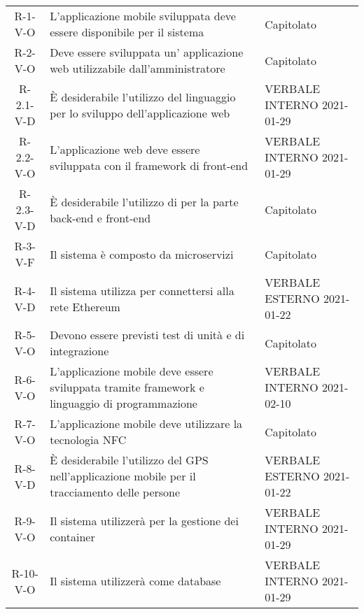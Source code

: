 \begin{longtable}{ c C{7.5cm} C{3cm} }
    R-1-V-O     & L'applicazione mobile sviluppata deve essere disponibile per il sistema  & Capitolato\\
    R-2-V-O     & Deve essere sviluppata un' applicazione web utilizzabile dall'amministratore & Capitolato\\
    R-2.1-V-D   & \`{E} desiderabile l'utilizzo del linguaggio  per lo sviluppo dell'applicazione web & VERBALE INTERNO 2021-01-29 \\
    R-2.2-V-O   & L'applicazione web deve essere sviluppata con il framework di front-end  & VERBALE INTERNO 2021-01-29 \\
    R-2.3-V-D   & \`{E} desiderabile l'utilizzo di  per la parte back-end e front-end &  Capitolato \\
    R-3-V-F     & Il sistema è composto da microservizi & Capitolato\\
    R-4-V-D     & Il sistema utilizza  per connettersi alla rete Ethereum & VERBALE ESTERNO 2021-01-22\\
    R-5-V-O     & Devono essere previsti test di unità e di integrazione & Capitolato\\
    R-6-V-O     & L'applicazione mobile deve essere sviluppata tramite framework  e linguaggio di programmazione  & VERBALE INTERNO 2021-02-10 \\
    R-7-V-O     & L'applicazione mobile deve utilizzare la tecnologia NFC & Capitolato \\
    R-8-V-D     & \`{E} desiderabile l'utilizzo del GPS nell'applicazione mobile per il tracciamento delle persone & VERBALE ESTERNO 2021-01-22 \\
    R-9-V-O     & Il sistema utilizzerà  per la gestione dei container & VERBALE INTERNO 2021-01-29 \\
    R-10-V-O    & Il sistema utilizzerà  come database & VERBALE INTERNO 2021-01-29 \\



\end{longtable}